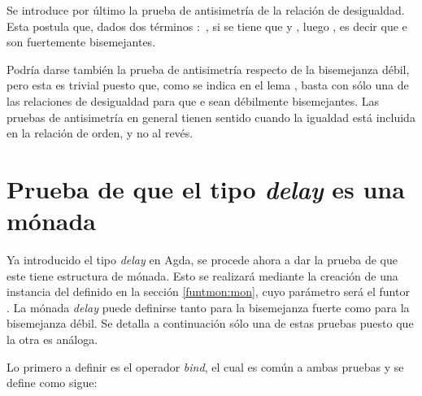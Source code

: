 Se introduce por último la prueba de antisimetría de la relación de desigualdad. Esta postula que, dados dos términos  $:$  \AgdaDatatype{$\bot$}, si se tiene que  \AgdaFunction{$\gtrsim$}  y  \AgdaFunction{$\lesssim$} , luego  \AgdaFunction{$\cong$} , es decir que  e  son fuertemente bisemejantes.


Podría darse también la prueba de antisimetría respecto de la bisemejanza débil, pero esta es trivial puesto que, como se indica en el lema \AgdaFunction{$\gtrsim\Rightarrow$}, basta con sólo una de las relaciones de desigualdad para que  e  sean débilmente bisemejantes. Las pruebas de antisimetría en general tienen sentido cuando la igualdad está incluida en la relación de orden, y no al revés.


\section{Prueba de que el tipo \textit{delay} es una mónada}\label{casodelay:monada}

Ya introducido el tipo \textit{delay} en Agda, se procede ahora a dar la prueba de que este tiene estructura de mónada. Esto se realizará mediante la creación de una instancia del   definido en la sección \ref{funtmon:mon}, cuyo parámetro será el funtor \AgdaFunction{\_$\bot$}. La mónada \textit{delay} puede definirse tanto para la bisemejanza fuerte como para la bisemejanza débil. Se detalla a continuación sólo una de estas pruebas puesto que la otra es análoga. 

Lo primero a definir es el operador \textit{bind}, el cual es común a ambas pruebas y se define como sigue:

